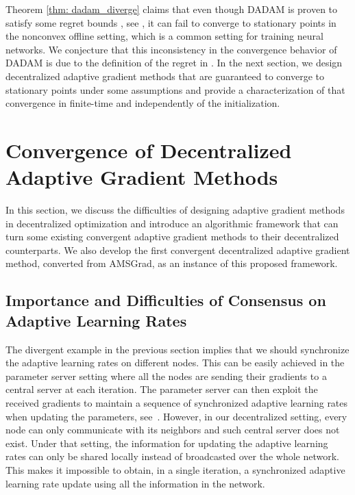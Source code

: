 \documentclass{article} %
\begin{document}
Theorem \ref{thm: dadam_diverge} claims that even though DADAM is proven to satisfy some regret bounds , see \citep{nazari2019dadam}, it can fail to converge to stationary points in the nonconvex offline setting, which is a common setting for training neural networks. 
We conjecture that this inconsistency in the convergence behavior of DADAM is due to the definition of the regret in \citet{nazari2019dadam}. 
In the next section, we design decentralized adaptive gradient methods that are guaranteed to converge to stationary points under some assumptions and provide a characterization of that convergence in finite-time and independently of the initialization.

\vspace{-0.05in}
\section{Convergence of Decentralized Adaptive Gradient Methods}\label{sec:main}
\vspace{-0.05in}

In this section, we discuss the difficulties of designing adaptive gradient methods in decentralized optimization and introduce an algorithmic framework that can turn some existing convergent adaptive gradient methods to their decentralized counterparts. 
We also develop the first convergent decentralized adaptive gradient method, converted from AMSGrad, as an instance of this proposed framework.

\vspace{-0.05in}
\subsection{Importance and Difficulties of Consensus on Adaptive Learning Rates}
\vspace{-0.05in}

The divergent example in the previous section implies that we should synchronize the adaptive learning rates on different nodes. 
This can be easily achieved in the parameter server setting where all the nodes are sending their gradients to a central server at each iteration.
The parameter server can then exploit the received gradients to maintain a sequence of synchronized adaptive learning rates when updating the parameters, see~\citep{reddi2020adaptive}.
However, in our decentralized setting, every node can only communicate with its neighbors and such central server does not exist.
Under that setting, the information for updating the adaptive learning rates can only be shared locally instead of broadcasted over the whole network.
This makes it impossible to obtain, in a single iteration, a synchronized adaptive learning rate update using all the information in the network. 
\end{document}
